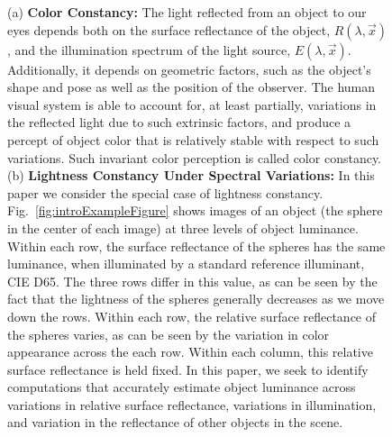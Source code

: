 \documentclass{jov}
\begin{document}
\begin{figure}
    \caption{(a) {\bf Color Constancy:} The light reflected from an object to our eyes depends both on the surface reflectance of the object, $R(\lambda,\vec{x})$, and the illumination spectrum of the light source, $E(\lambda,\vec{x})$. Additionally, it depends on geometric factors, such as the object's shape and pose as well as the position of the observer. The human visual system is able to account for, at least partially, variations in the reflected light due to such extrinsic factors, and produce a percept of object color that is relatively stable with respect to such variations. Such invariant color perception is called color constancy. (b) {\bf Lightness Constancy Under Spectral Variations:} In this paper we consider the special case of lightness constancy. Fig.~\ref{fig:introExampleFigure} shows images of an object (the sphere in the center of each image) at three levels of object luminance. Within each row, the surface reflectance of the spheres has the same luminance, when illuminated by a standard reference illuminant, CIE D65. The three rows differ in this value, as can be seen by the fact that the lightness of the spheres generally decreases as we move down the rows. Within each row, the relative surface reflectance of the spheres varies, as can be seen by the variation in color appearance across the each row.  Within each column, this relative surface reflectance is held fixed. In this paper, we seek to identify computations that accurately estimate object luminance across variations in relative surface reflectance, variations in illumination, and variation in the reflectance of other objects in the scene.}
 \end{figure}
\end{document}
